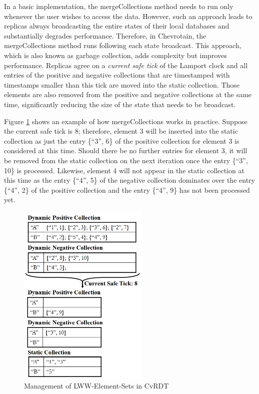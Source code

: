 \documentclass[sigconf,nonacm,11pt]{acmart}
\begin{document}
In a basic implementation, the mergeCollections method needs to run only whenever the user wishes to access the data. However, such an approach leads to replicas always broadcasting the entire states of their local databases and substantially degrades performance. Therefore, in Chevrotain, the mergeCollections method runs following each state broadcast. This approach, which is also known as garbage collection, adds complexity but improves performance. Replicas agree on a \emph{current safe tick} of the Lamport clock and all entries of the positive and negative collections that are timestamped with timestamps smaller than this tick are moved into the static collection. Those elements are also removed from the positive and negative collections at the same time, significantly reducing the size of the state that needs to be broadcast.

Figure \ref{fig:cvrdt2} shows an example of how mergeCollections works in practice. Suppose the current safe tick is 8; therefore, element 3 will be inserted into the static collection as just the entry \{``3'', 6\} of the positive collection for element 3 is considered at this time. Should there be no further entries for element 3, it will be removed from the static collection on the next iteration once the entry \{``3'', 10\} is processed. Likewise, element 4 will not appear in the static collection at this time as the entry \{``4'', 5\} of the negative collection dominates over the entry \{``4'', 2\} of the positive collection and the entry \{``4'', 9\} has not been processed yet.

\begin{figure}[h]
  \centering
  \includegraphics[width=6.25cm]{Fig3CvRDT2}
  \caption{Management of LWW-Element-Sets in CvRDT}
  \label{fig:cvrdt2}
\end{figure}
\end{document}
